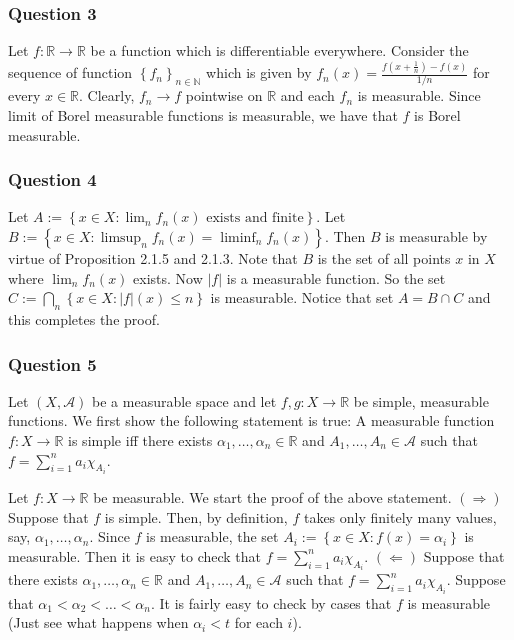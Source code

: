 \documentclass[12pt]{article}
\theoremstyle{definition}
\theoremstyle{remark}
\theoremstyle{plain}
\newcommand{\R}{\mathbb R}
\newcommand{\N}{\mathbb N}
\newcommand{\scrA}{{\mathscr A}}
\begin{document}
\subsubsection{Question 3}
Let $f: \R \to \R$ be a function which is differentiable everywhere. Consider the sequence of function $\left\{ f_n \right\}_{n\in \N}$ which is given by $f_n \left( x \right) = \frac{f\left( x+ \frac{1}{n} \right)-f\left( x \right) }{1/n}$ for every $x\in\R$. Clearly, $f_n \to f$ pointwise on $\R$ and each $f_n$ is measurable. Since limit of Borel measurable functions is measurable, we have that $f$ is Borel measurable. 

\subsubsection{Question 4}
Let $A:=\left\{ x\in X : \lim_{n} f_n (x) \text{ exists and finite} \right\}$. Let $B:=\left\{ x\in X: \limsup_n f_n (x) =\liminf_n f_n (x) \right\}$. Then $B$ is measurable by virtue of Proposition 2.1.5 and 2.1.3. Note that $B$ is the set of all points $x$ in $X$ where $\lim_n f_n (x)$ exists.  Now $|f|$ is a measurable function. So the set $C:=\bigcap_n \left\{ x\in X : |f| (x) \le n \right\}$ is measurable. Notice that set $A= B\cap C$ and this completes the proof. 

\subsubsection{Question 5}
Let $\left( X, \scrA \right)$ be a measurable space and let $f,g: X\to \R$ be simple, measurable functions. We first show the following statement is true: A measurable function $f: X\to \R$ is simple iff there exists $\alpha _1 , \ldots , \alpha _n \in \R$ and $A_1 , \ldots , A_n \in \scrA$ such that $f=\sum_{i=1}^{n} a_i \chi_{A_i}$.

Let $f: X\to \R$ be measurable. We start the proof of the above statement. $\left( \Longrightarrow \right)$ Suppose that $f$ is simple. Then, by definition, $f$ takes only finitely many values, say, $\alpha _1 , \ldots, \alpha _n$. Since $f$ is measurable, the set $A_i := \left\{ x\in X : f\left( x \right) = \alpha _i \right\}$ is measurable. Then it is easy to check that $f=\sum_{i=1}^{n} a_i \chi_{A_i}$. $(\Longleftarrow)$ Suppose that there exists $\alpha _1 , \ldots , \alpha _n \in \R$ and $A_1 , \ldots , A_n \in \scrA$ such that $f=\sum_{i=1}^{n} a_i \chi_{A_i}$. Suppose that $\alpha_1 < \alpha _2 < \ldots < \alpha _n$. It is fairly easy to check by cases that $f$ is measurable (Just see what happens when $\alpha_i<t$ for each $i$).
\end{document}
